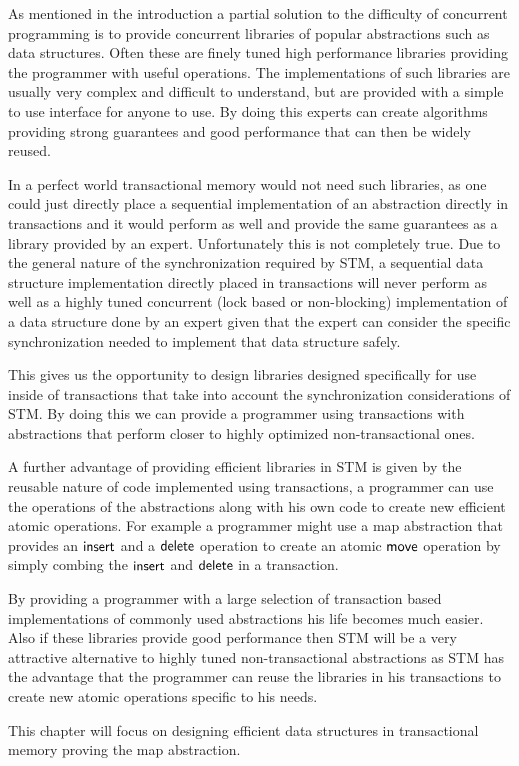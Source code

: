 
As mentioned in the introduction a partial solution to the difficulty of concurrent programming
is to provide concurrent libraries of popular abstractions such as data structures.
Often these are finely tuned high performance libraries
providing the programmer with useful operations.
The implementations of such libraries are usually very complex
and difficult to understand, but are provided with a simple to use
interface for anyone to use.
By doing this experts can create algorithms providing strong guarantees
and good performance that can then be widely reused.

In a perfect world transactional memory would not need such libraries,
as one could just directly place a sequential implementation of an abstraction
directly in transactions and it would perform as well and provide the same
guarantees as a library provided by an expert.
Unfortunately this is not completely true.
Due to the general nature
of the synchronization required by STM, a sequential data structure implementation directly
placed in transactions will never perform as well as a highly tuned concurrent
(lock based or non-blocking) implementation of a data structure done by an expert
given that the expert can consider the specific synchronization needed to implement
that data structure safely.

This gives us the opportunity to design libraries designed specifically for use inside
of transactions that take into account the synchronization considerations
of STM.
By doing this we can provide a programmer using transactions with abstractions that perform closer
to highly optimized non-transactional ones.

A further advantage of providing efficient libraries in STM is given by the reusable nature of code implemented using
transactions, a programmer can use the operations of the abstractions along with his own code
to create new efficient atomic operations.
For example a programmer might use a map abstraction that provides an $\lit{insert}$ and a $\lit{delete}$ operation
to create an atomic $\lit{move}$ operation by simply combing the $\lit{insert}$ and $\lit{delete}$ in a transaction.

By providing a programmer with a large selection of transaction based implementations of commonly used abstractions
his life becomes much easier.
Also if these libraries provide good performance then STM will be a very attractive alternative to highly tuned
non-transactional abstractions as STM has the advantage that the programmer can reuse the libraries in his transactions to create new
atomic operations specific to his needs.

This chapter will focus on designing efficient data structures in transactional memory proving the map abstraction.